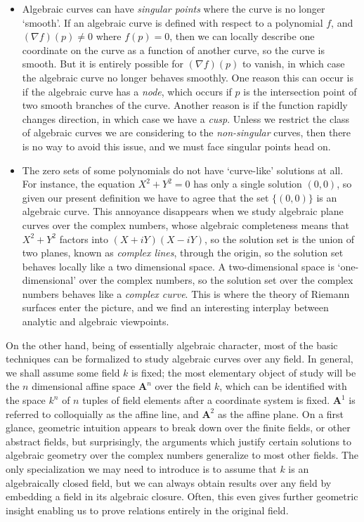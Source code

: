 \begin{itemize}
    \item Algebraic curves can have \emph{singular points} where the curve is no longer `smooth'. If an algebraic curve is defined with respect to a polynomial $f$, and $(\nabla f)(p) \neq 0$ where $f(p) = 0$, then we can locally describe one coordinate on the curve as a function of another curve, so the curve is smooth. But it is entirely possible for $(\nabla f)(p)$ to vanish, in which case the algebraic curve no longer behaves smoothly. One reason this can occur is if the algebraic curve has a \emph{node}, which occurs if $p$ is the intersection point of two smooth branches of the curve. Another reason is if the function rapidly changes direction, in which case we have a \emph{cusp}. Unless we restrict the class of algebraic curves we are considering to the \emph{non-singular} curves, then there is no way to avoid this issue, and we must face singular points head on.

    \item The zero sets of some polynomials do not have `curve-like' solutions at all. For instance, the equation $X^2 + Y^2 = 0$ has only a single solution $(0,0)$, so given our present definition we have to agree that the set $\{ (0,0) \}$ is an algebraic curve. This annoyance disappears when we study algebraic plane curves over the complex numbers, whose algebraic completeness means that $X^2 + Y^2$ factors into $(X + iY)(X - iY)$, so the solution set is the union of two planes, known as \emph{complex lines}, through the origin, so the solution set behaves locally like a two dimensional space. A two-dimensional space is `one-dimensional' over the complex numbers, so the solution set over the complex numbers behaves like a \emph{complex curve}. This is where the theory of Riemann surfaces enter the picture, and we find an interesting interplay between analytic and algebraic viewpoints.
\end{itemize}
%
On the other hand, being of essentially algebraic character, most of the basic techniques can be formalized to study algebraic curves over any field. In general, we shall assume some field $k$ is fixed; the most elementary object of study will be the $n$ dimensional affine space $\mathbf{A}^n$ over the field $k$, which can be identified with the space $k^n$ of $n$ tuples of field elements after a coordinate system is fixed. $\mathbf{A}^1$ is referred to colloquially as the affine line, and $\mathbf{A}^2$ as the affine plane. On a first glance, geometric intuition appears to break down over the finite fields, or other abstract fields, but surprisingly, the arguments which justify certain solutions to algebraic geometry over the complex numbers generalize to most other fields. The only specialization we may need to introduce is to assume that $k$ is an algebraically closed field, but we can always obtain results over any field by embedding a field in its algebraic closure. Often, this even gives further geometric insight enabling us to prove relations entirely in the original field.

